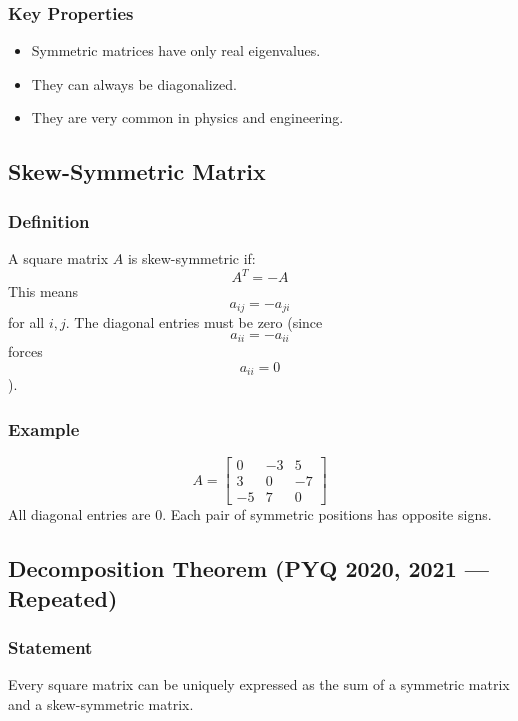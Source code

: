\documentclass[
]{article}
\providecommand{\tightlist}{%
  \setlength{\itemsep}{0pt}\setlength{\parskip}{0pt}}
\begin{document}
\subsubsection{Key Properties}\label{key-properties}

\begin{itemize}
\tightlist
\item
  Symmetric matrices have only real eigenvalues.
\item
  They can always be diagonalized.
\item
  They are very common in physics and engineering.
\end{itemize}

\subsection{Skew-Symmetric Matrix}\label{skew-symmetric-matrix}

\subsubsection{Definition}\label{definition-7}

A square matrix \(A\) is skew-symmetric if:
\[
A^T = -A
\]
This means
\[
a_{ij} = -a_{ji}
\]
for all \(i, j\). The diagonal entries must be zero (since
\[
a_{ii} = -a_{ii}
\]
forces
\[
a_{ii} = 0
\]
).

\subsubsection{Example}\label{example-1}
\[
A =
\begin{bmatrix}
0 & -3 & 5 \\
3 & 0 & -7 \\
-5 & 7 & 0
\end{bmatrix}
\]
All diagonal entries are 0. Each pair of symmetric positions has
opposite signs.

\subsection{Decomposition Theorem (PYQ 2020, 2021 ---
Repeated)}\label{decomposition-theorem-pyq-2020-2021-repeated}

\subsubsection{Statement}\label{statement-1}

Every square matrix can be uniquely expressed as the sum of a symmetric
matrix and a skew-symmetric matrix.
\end{document}
